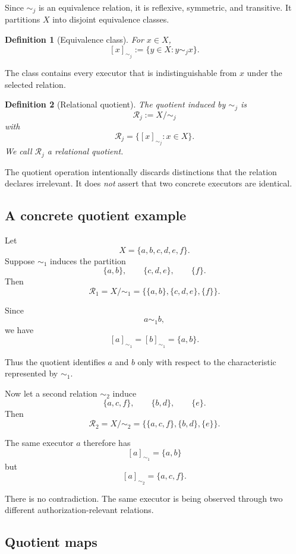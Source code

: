 \documentclass[10pt,twocolumn]{article}
\newcommand{\Rel}{\mathcal{R}}
\newtheorem{definition}{Definition}
\begin{document}
Since \(\sim_j\) is an equivalence relation, it is reflexive, symmetric, and
transitive. It partitions \(X\) into disjoint equivalence classes.

\begin{definition}[Equivalence class]
For \(x\in X\),
\[
[x]_{\sim_j}
:=
\{y\in X:y\sim_j x\}.
\]
\end{definition}

The class contains every executor that is indistinguishable from \(x\) under
the selected relation.

\begin{definition}[Relational quotient]
The quotient induced by \(\sim_j\) is
\[
\boxed{
\Rel_j := X/{\sim_j}
}
\]
with
\[
\Rel_j
=
\{
[x]_{\sim_j}:x\in X
\}.
\]
We call \(\Rel_j\) a \emph{relational quotient}.
\end{definition}

The quotient operation intentionally discards distinctions that the relation
declares irrelevant. It does \emph{not} assert that two concrete executors are
identical.

\subsection{A concrete quotient example}

Let
\[
X=\{a,b,c,d,e,f\}.
\]
Suppose \(\sim_1\) induces the partition
\[
\{a,b\},
\qquad
\{c,d,e\},
\qquad
\{f\}.
\]
Then
\[
\Rel_1
=
X/{\sim_1}
=
\big\{
\{a,b\},
\{c,d,e\},
\{f\}
\big\}.
\]

Since
\[
a\sim_1 b,
\]
we have
\[
[a]_{\sim_1}
=
[b]_{\sim_1}
=
\{a,b\}.
\]

Thus the quotient identifies \(a\) and \(b\) only with respect to the
characteristic represented by \(\sim_1\).

Now let a second relation \(\sim_2\) induce
\[
\{a,c,f\},
\qquad
\{b,d\},
\qquad
\{e\}.
\]
Then
\[
\Rel_2
=
X/{\sim_2}
=
\big\{
\{a,c,f\},
\{b,d\},
\{e\}
\big\}.
\]

The same executor \(a\) therefore has
\[
[a]_{\sim_1}
=
\{a,b\}
\]
but
\[
[a]_{\sim_2}
=
\{a,c,f\}.
\]

There is no contradiction. The same executor is being observed through two
different authorization-relevant relations.

\subsection{Quotient maps}
\end{document}
